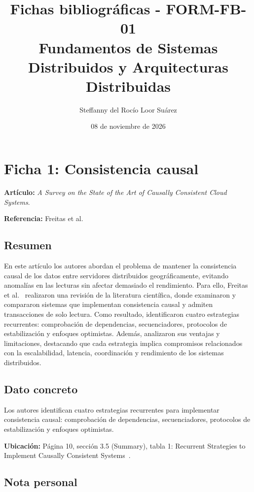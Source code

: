 \documentclass[12pt,a4paper]{article}
\title{Fichas bibliográficas - FORM-FB-01\\
Fundamentos de Sistemas Distribuidos y Arquitecturas Distribuidas}
\author{Steffanny del Rocío Loor Suárez}
\date{08 de noviembre de 2026}
\begin{document}
\maketitle

\section*{Ficha 1: Consistencia causal}

\noindent\textbf{Artículo:} \textit{A Survey on the State of the Art of Causally Consistent Cloud Systems}.

\noindent\textbf{Referencia:} Freitas et al.~\cite{freitas2025}

\subsection*{Resumen}

En este artículo los autores abordan el problema de mantener la consistencia causal de los datos entre servidores distribuidos geográficamente, evitando anomalías en las lecturas sin afectar demasiado el rendimiento. Para ello, Freitas et al.~\cite{freitas2025} realizaron una revisión de la literatura científica, donde examinaron y compararon sistemas que implementan consistencia causal y admiten transacciones de solo lectura. Como resultado, identificaron cuatro estrategias recurrentes: comprobación de dependencias, secuenciadores, protocolos de estabilización y enfoques optimistas. Además, analizaron sus ventajas y limitaciones, destacando que cada estrategia implica compromisos relacionados con la escalabilidad, latencia, coordinación y rendimiento de los sistemas distribuidos.

\subsection*{Dato concreto}

Los autores identifican cuatro estrategias recurrentes para implementar consistencia causal: comprobación de dependencias, secuenciadores, protocolos de estabilización y enfoques optimistas.

\textbf{Ubicación:} Página 10, sección 3.5 (Summary), tabla 1: Recurrent Strategies to Implement Causally Consistent Systems~\cite{freitas2025}.

\subsection*{Nota personal}
\end{document}
